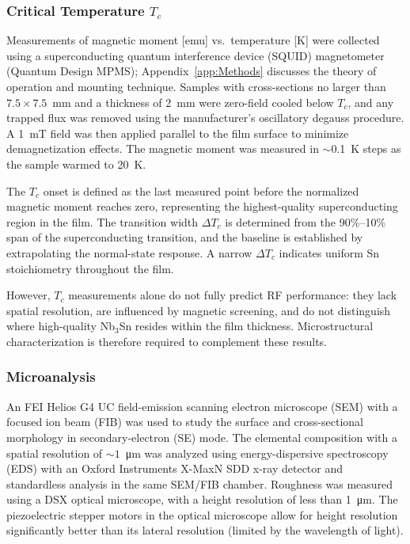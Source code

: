         \subsubsection{Critical Temperature \texorpdfstring{$T_c$}{Tc}}

        Measurements of magnetic moment [emu] vs.\ temperature [K] were collected using a superconducting quantum interference device (SQUID) magnetometer (Quantum Design MPMS); Appendix~\ref{app:Methods} discusses the theory of operation and mounting technique. Samples with cross-sections no larger than $7.5 \times 7.5$~mm and a thickness of 2~mm were zero-field cooled below $T_c$, and any trapped flux was removed using the manufacturer's oscillatory degauss procedure. A 1~mT field was then applied parallel to the film surface to minimize demagnetization effects. The magnetic moment was measured in $\sim$0.1~K steps as the sample warmed to 20~K.
        
        The $T_c$ onset is defined as the last measured point before the normalized magnetic moment reaches zero, representing the highest-quality superconducting region in the film. The transition width $\Delta T_c$ is determined from the 90\%--10\% span of the superconducting transition, and the baseline is established by extrapolating the normal-state response. A narrow $\Delta T_c$ indicates uniform Sn stoichiometry throughout the film.
        
        However, $T_c$ measurements alone do not fully predict RF performance: they lack spatial resolution, are influenced by magnetic screening, and do not distinguish where high-quality Nb$_3$Sn resides within the film thickness. Microstructural characterization is therefore required to complement these results.
        
        \subsubsection{Microanalysis}

        
        
        An FEI Helios G4 UC field-emission scanning electron microscope (SEM) with a focused ion beam (FIB) was used to study the surface and cross-sectional morphology in secondary-electron (SE) mode. The elemental composition with a spatial resolution of $\sim1$~\unit{\um} was analyzed using energy-dispersive spectroscopy (EDS) with an Oxford Instruments X-MaxN SDD x-ray detector and standardless analysis in the same SEM/FIB chamber. Roughness was measured using a DSX optical microscope, with a height resolution of less than 1~\unit{\um}. The piezoelectric stepper motors in the optical microscope allow for height resolution significantly better than its lateral resolution (limited by the wavelength of light).
        
